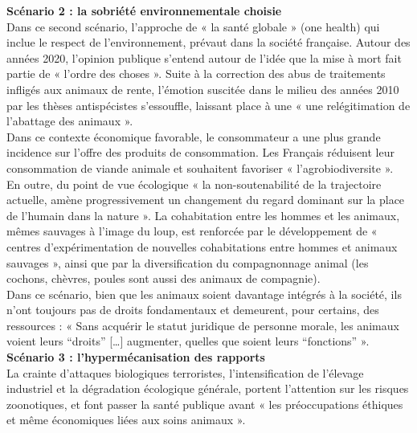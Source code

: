 \documentclass[10pt]{article}
\begin{document}
\newpage

\textbf{Scénario 2 : la sobriété environnementale choisie}\\

Dans ce second scénario, l’approche de « la santé globale » (one health) qui inclue le respect de l’environnement, prévaut dans la société française. Autour des années 2020, l’opinion publique s’entend autour de l’idée que la mise à mort fait partie de « l’ordre des choses ». Suite à la correction des abus de traitements infligés aux animaux de rente, l’émotion suscitée dans le milieu des années 2010 par les thèses antispécistes s’essouffle, laissant place à une « une relégitimation de l’abattage des animaux ».\\

Dans ce contexte économique favorable, le consommateur a une plus grande incidence sur l’offre des produits de consommation. Les Français réduisent leur consommation de viande animale et souhaitent favoriser « l’agrobiodiversite ».\\

En outre, du point de vue écologique « la non-soutenabilité de la trajectoire actuelle, amène progressivement un changement du regard dominant sur la place de l’humain dans la nature ». La cohabitation entre les hommes et les animaux, mêmes sauvages à l’image du loup, est renforcée par le développement de « centres d’expérimentation de nouvelles cohabitations entre hommes et animaux sauvages », ainsi que par la diversification du compagnonnage animal (les cochons, chèvres, poules sont aussi des animaux de compagnie).\\

Dans ce scénario, bien que les animaux soient davantage intégrés à la société, ils n’ont toujours pas de droits fondamentaux et demeurent, pour certains, des ressources : « Sans acquérir le statut juridique de personne morale, les animaux voient leurs “droits” […] augmenter, quelles que soient leurs “fonctions” ».\\

\textbf{Scénario 3 : l’hypermécanisation des rapports}\\

La crainte d’attaques biologiques terroristes, l’intensification de l’élevage industriel et la dégradation écologique générale, portent l’attention sur les risques zoonotiques, et font passer la santé publique avant « les préoccupations éthiques et même économiques liées aux soins animaux ».\\
\end{document}
